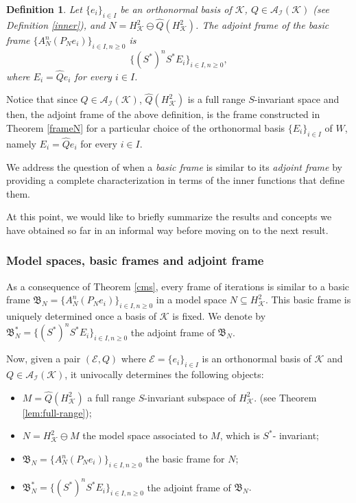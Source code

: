 \documentclass[a4paper,12pt]{amsart}
\def\cA{{\mathcal{A}}}
\def\cI{{\mathcal{I}}}
\def\KK{{\mathcal{K}}}
\newtheorem{definition}[theorem]{Definition}
\theoremstyle{definition}
\begin{document}
\begin{definition}\label{adjointf}
Let $\{e_i\}_{i\in I}$ be an orthonormal basis of $\KK$, $Q\in\cA_\cI(\KK)$ (see Definition \ref{inner}), and $N=H^2_\KK\ominus\widehat{Q}(H^2_\KK)$. The  adjoint frame of the basic frame $\{A_N^n(P_Ne_i)\}_{i\in I,n\geqslant0}$ is 
\begin{equation*}
\{(S^*)^n S^*E_i\}_{i\in I,n\geqslant0},
\end{equation*}
where $E_i=\widehat{Q}e_i$ for every $i\in I$.
\end{definition}

Notice that since $Q\in\cA_\cI(\KK)$, $\widehat{Q}(H^2_\KK)$ is a full range $S$-invariant space and then, the adjoint frame of the above definition, is the frame constructed in Theorem \ref{frameN} for a particular choice of the orthonormal basis $\{E_i\}_{i\in I}$ of $W$, namely $E_i=\widehat{Q}e_i$ for every $i\in I$.

We address the question of when a {\em basic frame } is similar to its {\em adjoint frame } by providing a complete characterization in terms of the inner functions that define them. 

At this point, we would like to briefly summarize the results and concepts we have obtained so far in an informal way before moving on to the next result.

\subsubsection*{Model spaces, basic frames and adjoint frame}
As a consequence of Theorem \ref{cms}, every frame of iterations is similar to a basic frame $\mathfrak{B}_N=\{A_N^n(P_Ne_i)\}_{i\in I,n\geqslant0}$ in a model space $N\subseteq H_{\KK}^2.$ This basic frame is uniquely determined once a basis of $\KK$ is fixed. 
We denote by 
 $\mathfrak{B}_N^*=\{(S^*)^nS^*E_i\}_{i\in I,n\geqslant0}$ the adjoint frame of $\mathfrak{B}_N$.


Now, given a pair $(\mathcal E,Q)$ where $\mathcal E=\{e_i\}_{i\in I}$ is an orthonormal basis of $\KK$ and $Q\in\cA_\cI(\KK)$, it univocally determines the following objects:

\begin{itemize}
\item $M =\widehat{Q}( H_{\KK}^2)$ a full range $S$-invariant subspace of $H_{\KK}^2$. (see Theorem \ref{lem:full-range});

\item $N = H_{\KK}^2\ominus M$ the model space associated to $M$, which is $S^*$- invariant;

\item $\mathfrak{B}_N =\{A_N^n(P_Ne_i)\}_{i\in I,n\geqslant0}$ the basic frame for $N$;

\item $\mathfrak{B}_N^* =\{(S^*)^nS^*E_i\}_{i\in I,n\geqslant0}$ the adjoint frame of $\mathfrak{B}_N.$
\end{itemize}
\end{document}
